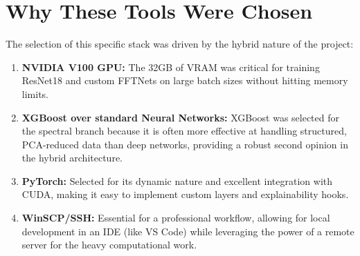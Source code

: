 \section{Why These Tools Were Chosen}
The selection of this specific stack was driven by the hybrid nature of the project:

\begin{enumerate}
    \item \textbf{NVIDIA V100 GPU:} The 32GB of VRAM was critical for training ResNet18 and custom FFTNets on large batch sizes without hitting memory limits.
    \item \textbf{XGBoost over standard Neural Networks:} XGBoost was selected for the spectral branch because it is often more effective at handling structured, PCA-reduced data than deep networks, providing a robust second opinion in the hybrid architecture.
    \item \textbf{PyTorch:} Selected for its dynamic nature and excellent integration with CUDA, making it easy to implement custom layers and explainability hooks.
    \item \textbf{WinSCP/SSH:} Essential for a professional workflow, allowing for local development in an IDE (like VS Code) while leveraging the power of a remote server for the heavy computational work.
\end{enumerate}
